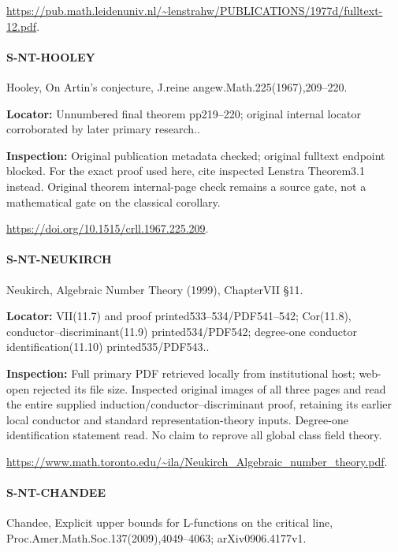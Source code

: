 \documentclass[11pt,a4paper]{article}
\begin{document}
\url{https://pub.math.leidenuniv.nl/~lenstrahw/PUBLICATIONS/1977d/fulltext-12.pdf}.

\paragraph{S-NT-HOOLEY} Hooley, On Artin’s conjecture, J.\allowbreak{}reine angew.\allowbreak{}Math.\allowbreak{}225(1967),209–\allowbreak{}220.

\textbf{Locator:} Unnumbered final theorem pp219–\allowbreak{}220; original internal locator corroborated by later primary research.\allowbreak{}.

\textbf{Inspection:} Original publication metadata checked; original fulltext endpoint blocked.\allowbreak{} For the exact proof used here, cite inspected Lenstra Theorem3.\allowbreak{}1 instead.\allowbreak{} Original theorem internal-page check remains a source gate, not a mathematical gate on the classical corollary.\allowbreak{}

\url{https://doi.org/10.1515/crll.1967.225.209}.

\paragraph{S-NT-NEUKIRCH} Neukirch, Algebraic Number Theory (1999), ChapterVII §11.

\textbf{Locator:} VII(11.\allowbreak{}7) and proof printed533–\allowbreak{}534/\allowbreak{}PDF541–\allowbreak{}542; Cor(11.\allowbreak{}8), conductor–\allowbreak{}discriminant(11.\allowbreak{}9) printed534/\allowbreak{}PDF542; degree-one conductor identification(11.\allowbreak{}10) printed535/\allowbreak{}PDF543.\allowbreak{}.

\textbf{Inspection:} Full primary PDF retrieved locally from institutional host; web-open rejected its file size.\allowbreak{} Inspected original images of all three pages and read the entire supplied induction/\allowbreak{}conductor–\allowbreak{}discriminant proof, retaining its earlier local conductor and standard representation-theory inputs.\allowbreak{} Degree-one identification statement read.\allowbreak{} No claim to reprove all global class field theory.\allowbreak{}

\url{https://www.math.toronto.edu/~ila/Neukirch_Algebraic_number_theory.pdf}.

\paragraph{S-NT-CHANDEE} Chandee, Explicit upper bounds for L-functions on the critical line, Proc.\allowbreak{}Amer.\allowbreak{}Math.\allowbreak{}Soc.\allowbreak{}137(2009),4049–\allowbreak{}4063; arXiv0906.\allowbreak{}4177v1.
\end{document}
